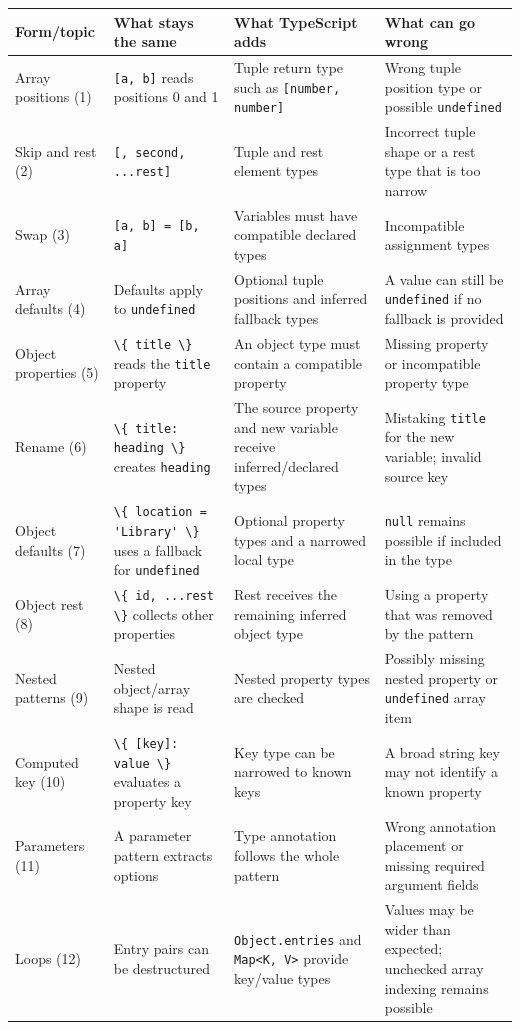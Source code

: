 \documentclass[
]{article}
\newcommand{\passthrough}[1]{#1}
\begin{document}
\begin{longtable}[]{@{}llll@{}}
\toprule\noalign{}
Form/topic & What stays the same & What TypeScript adds & What can go
wrong \\
\midrule\noalign{}
\endhead
\bottomrule\noalign{}
\endlastfoot
Array positions (1) & \passthrough{\lstinline![a, b]!} reads positions 0
and 1 & Tuple return type such as
\passthrough{\lstinline![number, number]!} & Wrong tuple position type
or possible \passthrough{\lstinline!undefined!} \\
Skip and rest (2) & \passthrough{\lstinline![, second, ...rest]!} &
Tuple and rest element types & Incorrect tuple shape or a rest type that
is too narrow \\
Swap (3) & \passthrough{\lstinline![a, b] = [b, a]!} & Variables must
have compatible declared types & Incompatible assignment types \\
Array defaults (4) & Defaults apply to
\passthrough{\lstinline!undefined!} & Optional tuple positions and
inferred fallback types & A value can still be
\passthrough{\lstinline!undefined!} if no fallback is provided \\
Object properties (5) & \passthrough{\lstinline!\{ title \}!} reads the
\passthrough{\lstinline!title!} property & An object type must contain a
compatible property & Missing property or incompatible property type \\
Rename (6) & \passthrough{\lstinline!\{ title: heading \}!} creates
\passthrough{\lstinline!heading!} & The source property and new variable
receive inferred/declared types & Mistaking
\passthrough{\lstinline!title!} for the new variable; invalid source
key \\
Object defaults (7) &
\passthrough{\lstinline!\{ location = 'Library' \}!} uses a fallback for
\passthrough{\lstinline!undefined!} & Optional property types and a
narrowed local type & \passthrough{\lstinline!null!} remains possible if
included in the type \\
Object rest (8) & \passthrough{\lstinline!\{ id, ...rest \}!} collects
other properties & Rest receives the remaining inferred object type &
Using a property that was removed by the pattern \\
Nested patterns (9) & Nested object/array shape is read & Nested
property types are checked & Possibly missing nested property or
\passthrough{\lstinline!undefined!} array item \\
Computed key (10) & \passthrough{\lstinline!\{ [key]: value \}!}
evaluates a property key & Key type can be narrowed to known keys & A
broad string key may not identify a known property \\
Parameters (11) & A parameter pattern extracts options & Type annotation
follows the whole pattern & Wrong annotation placement or missing
required argument fields \\
Loops (12) & Entry pairs can be destructured &
\passthrough{\lstinline!Object.entries!} and
\passthrough{\lstinline!Map<K, V>!} provide key/value types & Values may
be wider than expected; unchecked array indexing remains possible \\
\end{longtable}
\end{document}
